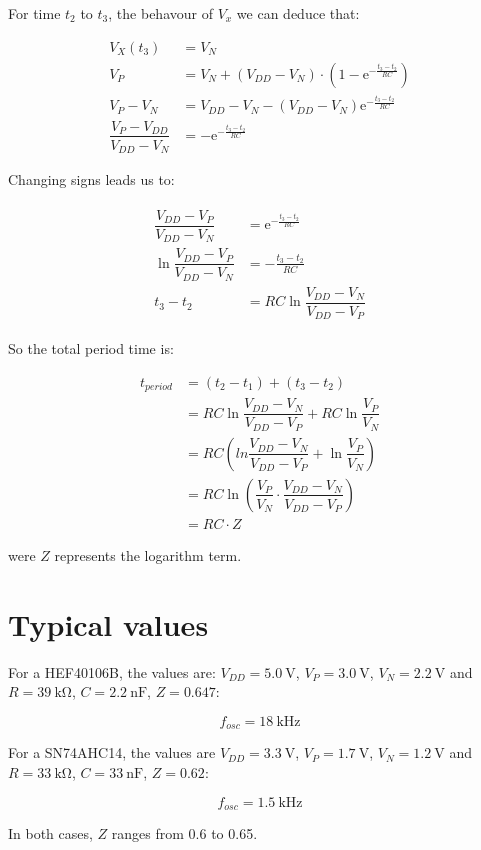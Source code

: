 \documentclass[a4paper,12pt]{article}
\begin{document}
For time $t_2$ to $t_3$, the behavour of $V_x$ we can deduce that:

\begin{equation}
\begin{split}
V_X(t_3)& = V_N \\
V_P &= V_N + (V_{DD}-V_N)\cdot(1-\mathrm{e}^{-\frac{t_3-t_2}{RC}})\\
V_P-V_N &= V_{DD}-V_N - (V_{DD}-V_N)\mathrm{e}^{-\frac{t_3-t_2}{RC}}\\
\dfrac{V_P-V_{DD}}{V_{DD}-V_N} &= -\mathrm{e}^{-\frac{t_3-t_2}{RC}}
\end{split}
\end{equation}

Changing signs leads us to:

\begin{eqnarray}
\begin{split}
\dfrac{V_{DD}-V_P}{V_{DD}-V_N} &= \mathrm{e}^{-\frac{t_3-t_2}{RC}} \\
\ln \dfrac{V_{DD}-V_P}{V_{DD}-V_N} &= -\frac{t_3-t_2}{RC} \\
t_3-t_2 &= RC\ln\dfrac{V_{DD}-V_N}{V_{DD}-V_P}
\end{split}
\end{eqnarray}

So the total period time is:

\begin{equation}
\begin{split}
t_{period} &= (t_2-t_1)+(t_3-t_2)\\
&= RC\ln\dfrac{V_{DD}-V_N}{V_{DD}-V_P} + RC\ln\dfrac{V_P}{V_N} \\
&= RC\left(ln\dfrac{V_{DD}-V_N}{V_{DD}-V_P}+\ln\dfrac{V_P}{V_N}\right)\\
&= RC\ln\left(\dfrac{V_P}{V_N}\cdot\dfrac{V_{DD}-V_N}{V_{DD}-V_P}\right)\\
&= RC\cdot Z
\end{split}
\end{equation}

were $Z$ represents the logarithm term.

\section{Typical values}
For a HEF40106B, the values are: $V_{DD} = \qty{5.0}{\volt}$, $V_P=\qty{3.0}{\volt}$, $V_N = \qty{2.2}{\volt}$ and $R = \qty{39}{\kilo\ohm}$, $C = \qty{2.2}{\nano\farad}$, $Z = \num{0.647}$:

\begin{equation}
f_{osc} = \qty{18}{\kilo\hertz}
\end{equation}

For a SN74AHC14, the values are $V_{DD} = \qty{3.3}{\volt}$, $V_P=\qty{1.7}{\volt}$, $V_N = \qty{1.2}{\volt}$ and $R = \qty{33}{\kilo\ohm}$, $C = \qty{33}{\nano\farad}$, $Z = \num{0.62}$:

\begin{equation}
f_{osc} = \qty{1.5}{\kilo\hertz}
\end{equation}

In both cases, $Z$ ranges from \num{0.6} to \num{0.65}.
\end{document}
